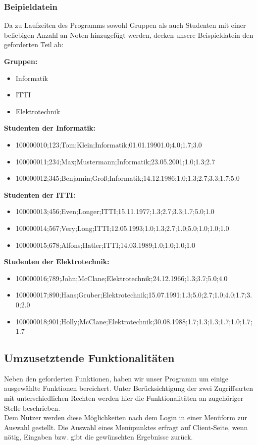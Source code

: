 \documentclass{scrartcl}
\begin{document}
		\subsubsection{Beipieldatein}
			Da zu Laufzeiten des Programms sowohl Gruppen als auch Studenten mit einer beliebigen Anzahl an Noten hinzugefügt werden, decken unsere Beispieldatein den geforderten Teil ab:
			
			\textbf{Gruppen:}
			\begin{itemize}
				\item Informatik
				\item ITTI
				\item Elektrotechnik
			\end{itemize}
			
			\textbf{Studenten der Informatik:}
			\begin{itemize}
				\item 100000010;123;Tom;Klein;Informatik;01.01.19901.0;4.0;1.7;3.0
				\item 100000011;234;Max;Mustermann;Informatik;23.05.2001;1.0;1.3;2.7
				\item 100000012;345;Benjamin;Groß;Informatik;14.12.1986;1.0;1.3;2.7;3.3;1.7;5.0
			\end{itemize}
			
			\textbf{Studenten der ITTI:}
			\begin{itemize}
				\item 100000013;456;Even;Longer;ITTI;15.11.1977;1.3;2.7;3.3;1.7;5.0;1.0
				\item 100000014;567;Very;Long;ITTI;12.05.1993;1.0;1.3;2.7;1.0;5.0;1.0;1.0;1.0
				\item 100000015;678;Alfons;Hatler;ITTI;14.03.1989;1.0;1.0;1.0;1.0
			\end{itemize}
			
			\textbf{Studenten der Elektrotechnik:}
			\begin{itemize}
				\item 100000016;789;John;McClane;Elektrotechnik;24.12.1966;1.3;3.7;5.0;4.0
				\item 100000017;890;Hans;Gruber;Elektrotechnik;15.07.1991;1.3;5.0;2.7;1.0;4.0;1.7;3.0;2.0
				\item 100000018;901;Holly;McClane;Elektrotechnik;30.08.1988;1.7;1.3;1.3;1.7;1.0;1.7;1.7
			\end{itemize}
		
	\subsection{Umzusetztende Funktionalitäten}
		Neben den geforderten Funktionen, haben wir unser Programm um einige ausgewählte Funktionen bereichert. Unter Berücksichtigung der zwei Zugriffsarten mit unterschiedlichen Rechten werden hier die Funktionalitäten an zugehöriger Stelle beschrieben.\\
		Dem Nutzer werden diese Möglichkeiten nach dem Login in einer Menüform zur Auswahl gestellt. Die Auswahl eines Menüpunktes erfragt auf Client-Seite, wenn nötig, Eingaben bzw. gibt die gewünschten Ergebnisse zurück.
\end{document}
